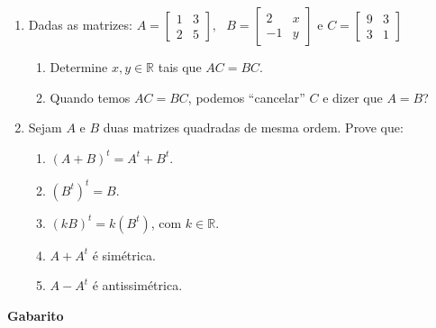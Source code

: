 \documentclass[12pt,a4paper]{article}
\begin{document}
\begin{enumerate}
  \item Dadas as matrizes:
    $A=
      \begin{bmatrix}
        1 & 3 \\
        2 & 5
      \end{bmatrix},
      \ \ \ 
    B=\begin{bmatrix}
      2 & x \\
      -1 & y
    \end{bmatrix}$ e 
    $C=\begin{bmatrix}
      9 & 3 \\
      3 & 1
    \end{bmatrix}$

    \begin{enumerate}
      \item Determine $x , y \in\mathbb{R}$ tais que $AC=BC$.
     \item Quando temos $AC=BC$, podemos ``cancelar'' $C$ e dizer que $A=B$? 
    \end{enumerate}

  \item  Sejam $A$ e $B$ duas matrizes quadradas de mesma ordem. Prove que:
    \begin{enumerate}
      \item $(A+B)^t = A^t + B^t$.
      \item $\left(B^t\right)^t = B$.
      \item $\left(kB\right)^t = k(B^t)$, com $k\in\mathbb{R}$.
      \item $A + A^t$ é simétrica.
      \item $A - A^t$ é antissimétrica.
    \end{enumerate}

  \end{enumerate}
  
\begin{center}
  \textbf{Gabarito}
\end{center}
\end{document}
